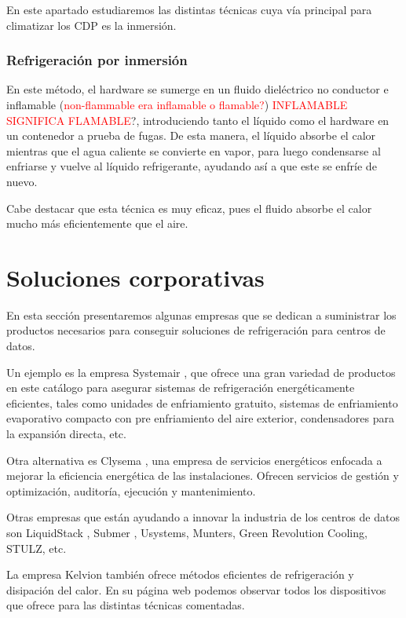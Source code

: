 En este apartado estudiaremos las distintas técnicas cuya vía principal para climatizar los CDP es la inmersión.

\subsubsection{Refrigeración por inmersión}

En este método, el hardware se sumerge en un fluido dieléctrico no conductor e inflamable (\textcolor{red}{non-flammable era inflamable o flamable?}) \textcolor{red}{INFLAMABLE SIGNIFICA FLAMABLE}?, introduciendo tanto el líquido como el hardware en un contenedor a prueba de fugas. De esta manera, el líquido absorbe el calor mientras que el agua caliente se convierte en vapor, para luego condensarse al enfriarse y vuelve al líquido refrigerante, ayudando así a que este se enfríe de nuevo.

Cabe destacar que esta técnica es muy eficaz, pues el fluido absorbe el calor mucho más eficientemente que el aire.

\section{Soluciones corporativas}


En esta sección presentaremos algunas empresas que se dedican a suministrar los productos necesarios para conseguir soluciones de refrigeración para centros de datos.

Un ejemplo es la empresa Systemair \cite{systemair}, que ofrece una gran variedad de productos en este catálogo para asegurar sistemas de refrigeración energéticamente eficientes, tales como unidades de enfriamiento gratuito, sistemas de enfriamiento evaporativo compacto con pre enfriamiento del aire exterior, condensadores para la expansión directa, etc.

Otra alternativa es Clysema \cite{clysema}, una empresa de servicios energéticos enfocada a mejorar la eficiencia energética de las instalaciones. Ofrecen servicios de gestión y optimización, auditoría, ejecución y mantenimiento.

Otras empresas que están ayudando a innovar la industria de los centros de datos son LiquidStack \cite{liquidstack}, Submer \cite{submer}, Usystems, Munters, Green Revolution Cooling, STULZ, etc.

La empresa Kelvion \cite{Kelvion} también ofrece métodos eficientes de refrigeración y disipación del calor. En su página web podemos observar todos los dispositivos que ofrece para las distintas técnicas comentadas. %



